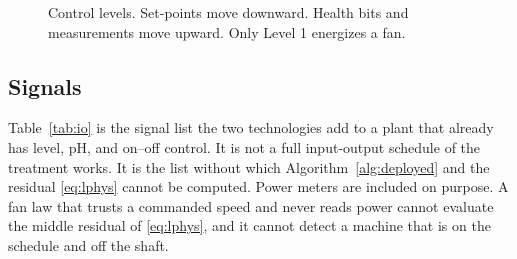 \begin{figure}[ht]
\centering
{}
\caption{Control levels. Set-points move downward. Health bits and measurements move upward. Only Level 1 energizes a fan.}
\label{fig:levels}
\end{figure}

\subsection{Signals}

Table~\ref{tab:io} is the signal list the two technologies add to a plant that already has level, pH, and on--off control. It is not a full input-output schedule of the treatment works. It is the list without which Algorithm~\ref{alg:deployed} and the residual \eqref{eq:lphys} cannot be computed. Power meters are included on purpose. A fan law that trusts a commanded speed and never reads power cannot evaluate the middle residual of \eqref{eq:lphys}, and it cannot detect a machine that is on the schedule and off the shaft.

